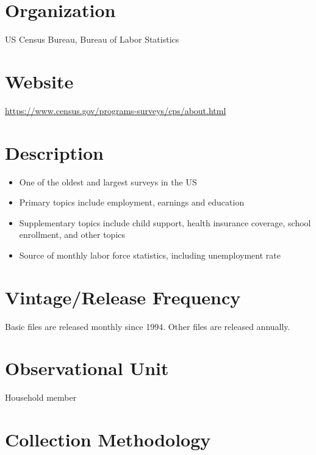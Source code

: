 \documentclass[
]{book}
\providecommand{\tightlist}{%
  \setlength{\itemsep}{0pt}\setlength{\parskip}{0pt}}
\begin{document}
\hypertarget{organization-21}{%
\section{Organization}\label{organization-21}}

US Census Bureau, Bureau of Labor Statistics

\hypertarget{website-21}{%
\section{Website}\label{website-21}}

\url{https://www.census.gov/programs-surveys/cps/about.html}

\hypertarget{description-21}{%
\section{Description}\label{description-21}}

\begin{itemize}
\tightlist
\item
  One of the oldest and largest surveys in the US
\item
  Primary topics include employment, earnings and education
\item
  Supplementary topics include child support, health insurance coverage, school enrollment, and other topics
\item
  Source of monthly labor force statistics, including unemployment rate
\end{itemize}

\hypertarget{vintagerelease-frequency-21}{%
\section{Vintage/Release Frequency}\label{vintagerelease-frequency-21}}

Basic files are released monthly since 1994. Other files are released annually.

\hypertarget{observational-unit-21}{%
\section{Observational Unit}\label{observational-unit-21}}

Household member

\hypertarget{collection-methodology-21}{%
\section{Collection Methodology}\label{collection-methodology-21}}
\end{document}
